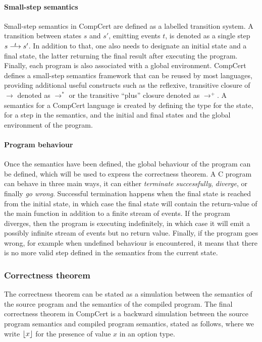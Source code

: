 \paragraph{Small-step semantics}

Small-step semantics in CompCert are defined as a labelled transition system.  A
transition between states $s$ and $s'$, emitting events $t$, is denoted as a
single step $s \oset{t}{\longrightarrow} s'$.  In addition to that, one also
needs to designate an initial state and a final state, the latter returning the
final result after executing the program.  Finally, each program is also
associated with a global environment.  CompCert defines a small-step semantics
framework that can be reused by most languages, providing additional useful
constructs such as the reflexive, transitive closure of $\longrightarrow$
denoted as $\longrightarrow^{*}$ or the transitive \enquote{plus} closure
denoted as $\longrightarrow^{+}$.  A semantics for a CompCert language is
created by defining the type for the state, for a step in the semantics, and the
initial and final states and the global environment of the program.

\paragraph{Program behaviour}

Once the semantics have been defined, the global behaviour of the program can be
defined, which will be used to express the correctness theorem.  A C program can
behave in three main ways, it can either \emph{terminate successfully},
\emph{diverge}, or finally \emph{go wrong}.  Successful termination happens when
the final state is reached from the initial state, in which case the final state
will contain the return-value of the main function in addition to a finite
stream of events.  If the program diverges, then the program is executing
indefinitely, in which case it will emit a possibly infinite stream of events
but no return value.  Finally, if the program goes wrong, for example when
undefined behaviour is encountered, it means that there is no more valid step
defined in the semantics from the current state.

\subsubsection{Correctness theorem}%
\label{sec:bg:correctness-theorem}

The correctness theorem can be stated as a simulation between the semantics of
the source program and the semantics of the compiled program.  The final
correctness theorem in CompCert is a backward simulation between the source
program semantics and compiled program semantics, stated as follows, where we
write $\lfloor x \rfloor$ for the presence of value $x$ in an option type.

